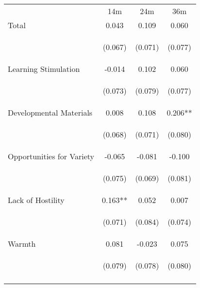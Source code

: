 \begin{tabular}{lccc}
\hline \noalign{\smallskip} & 14m & 24m & 36m\\
\noalign{\smallskip}\hline \noalign{\smallskip}Total & 0.043 & 0.109 & 0.060\\
 & \begin{footnotesize}(0.067)\end{footnotesize} & \begin{footnotesize}(0.071)\end{footnotesize} & \begin{footnotesize}(0.077)\end{footnotesize}\\
\noalign{\smallskip}Learning Stimulation & -0.014 & 0.102 & 0.060\\
 & \begin{footnotesize}(0.073)\end{footnotesize} & \begin{footnotesize}(0.079)\end{footnotesize} & \begin{footnotesize}(0.077)\end{footnotesize}\\
\noalign{\smallskip}Developmental Materials & 0.008 & 0.108 & 0.206**\\
 & \begin{footnotesize}(0.068)\end{footnotesize} & \begin{footnotesize}(0.071)\end{footnotesize} & \begin{footnotesize}(0.080)\end{footnotesize}\\
\noalign{\smallskip}Opportunities for Variety & -0.065 & -0.081 & -0.100\\
 & \begin{footnotesize}(0.075)\end{footnotesize} & \begin{footnotesize}(0.069)\end{footnotesize} & \begin{footnotesize}(0.081)\end{footnotesize}\\
\noalign{\smallskip}Lack of Hostility & 0.163** & 0.052 & 0.007\\
 & \begin{footnotesize}(0.071)\end{footnotesize} & \begin{footnotesize}(0.084)\end{footnotesize} & \begin{footnotesize}(0.074)\end{footnotesize}\\
\noalign{\smallskip}Warmth & 0.081 & -0.023 & 0.075\\
 & \begin{footnotesize}(0.079)\end{footnotesize} & \begin{footnotesize}(0.078)\end{footnotesize} & \begin{footnotesize}(0.080)\end{footnotesize}\\
\noalign{\smallskip}\hline\end{tabular}\\
